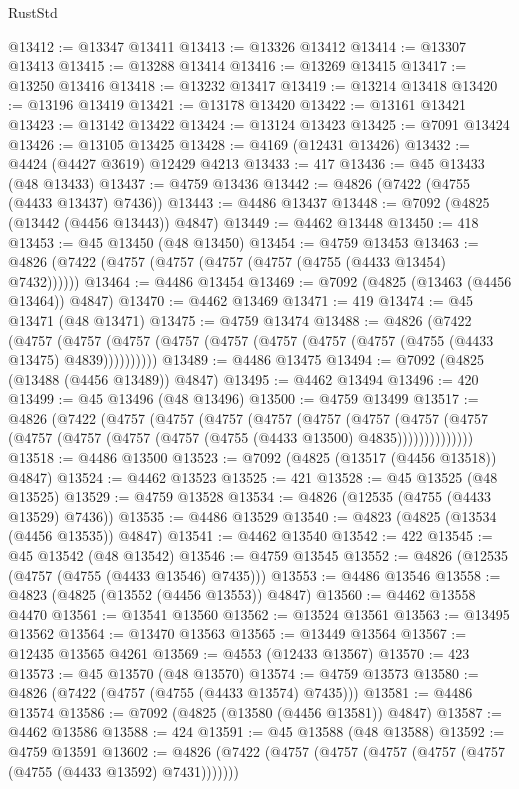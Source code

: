 \begin{lexlean}{RustStd}
\begin{coremodule}
@13412 := @13347 @13411
@13413 := @13326 @13412
@13414 := @13307 @13413
@13415 := @13288 @13414
@13416 := @13269 @13415
@13417 := @13250 @13416
@13418 := @13232 @13417
@13419 := @13214 @13418
@13420 := @13196 @13419
@13421 := @13178 @13420
@13422 := @13161 @13421
@13423 := @13142 @13422
@13424 := @13124 @13423
@13425 := @7091 @13424
@13426 := @13105 @13425
@13428 := @4169 (@12431 @13426)
@13432 := @4424 (@4427 @3619) @12429 @4213
@13433 := 417
@13436 := @45 @13433 (@48 @13433)
@13437 := @4759 @13436
@13442 := @4826 (@7422 (@4755 (@4433 @13437) @7436))
@13443 := @4486 @13437
@13448 := @7092 (@4825 (@13442 (@4456 @13443)) @4847)
@13449 := @4462 @13448
@13450 := 418
@13453 := @45 @13450 (@48 @13450)
@13454 := @4759 @13453
@13463 := @4826 (@7422 (@4757 (@4757 (@4757 (@4757 (@4755 (@4433 @13454) @7432))))))
@13464 := @4486 @13454
@13469 := @7092 (@4825 (@13463 (@4456 @13464)) @4847)
@13470 := @4462 @13469
@13471 := 419
@13474 := @45 @13471 (@48 @13471)
@13475 := @4759 @13474
@13488 := @4826
    (@7422
      (@4757 (@4757 (@4757 (@4757 (@4757 (@4757 (@4757 (@4757 (@4755 (@4433 @13475) @4839))))))))))
@13489 := @4486 @13475
@13494 := @7092 (@4825 (@13488 (@4456 @13489)) @4847)
@13495 := @4462 @13494
@13496 := 420
@13499 := @45 @13496 (@48 @13496)
@13500 := @4759 @13499
@13517 := @4826
    (@7422
      (@4757
        (@4757
          (@4757
            (@4757
              (@4757
                (@4757
                  (@4757
                    (@4757 (@4757 (@4757 (@4757 (@4757 (@4755 (@4433 @13500) @4835))))))))))))))
@13518 := @4486 @13500
@13523 := @7092 (@4825 (@13517 (@4456 @13518)) @4847)
@13524 := @4462 @13523
@13525 := 421
@13528 := @45 @13525 (@48 @13525)
@13529 := @4759 @13528
@13534 := @4826 (@12535 (@4755 (@4433 @13529) @7436))
@13535 := @4486 @13529
@13540 := @4823 (@4825 (@13534 (@4456 @13535)) @4847)
@13541 := @4462 @13540
@13542 := 422
@13545 := @45 @13542 (@48 @13542)
@13546 := @4759 @13545
@13552 := @4826 (@12535 (@4757 (@4755 (@4433 @13546) @7435)))
@13553 := @4486 @13546
@13558 := @4823 (@4825 (@13552 (@4456 @13553)) @4847)
@13560 := @4462 @13558 @4470
@13561 := @13541 @13560
@13562 := @13524 @13561
@13563 := @13495 @13562
@13564 := @13470 @13563
@13565 := @13449 @13564
@13567 := @12435 @13565 @4261
@13569 := @4553 (@12433 @13567)
@13570 := 423
@13573 := @45 @13570 (@48 @13570)
@13574 := @4759 @13573
@13580 := @4826 (@7422 (@4757 (@4755 (@4433 @13574) @7435)))
@13581 := @4486 @13574
@13586 := @7092 (@4825 (@13580 (@4456 @13581)) @4847)
@13587 := @4462 @13586
@13588 := 424
@13591 := @45 @13588 (@48 @13588)
@13592 := @4759 @13591
@13602 := @4826 (@7422 (@4757 (@4757 (@4757 (@4757 (@4757 (@4755 (@4433 @13592) @7431)))))))

\end{coremodule}
\end{lexlean}
